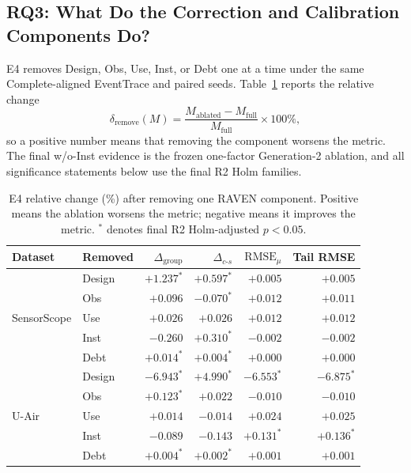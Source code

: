 \documentclass[letterpaper,journal]{IEEEtran}
\begin{document}
\subsection{RQ3: What Do the Correction and Calibration Components Do?}
\label{subsec:eval_rq3}

E4 removes Design, Obs, Use, Inst, or Debt one at a time under the same
Complete-aligned EventTrace and paired seeds.  Table~\ref{tab:e4_ablation}
reports the relative change
\begin{equation}
    \delta_{\mathrm{remove}}(M)
    =
    \frac{M_{\mathrm{ablated}}-M_{\mathrm{full}}}
         {M_{\mathrm{full}}}\times100\%,
    \label{eq:ablation_relative_change}
\end{equation}
so a positive number means that removing the component worsens the metric.
The final w/o-Inst evidence is the frozen one-factor Generation-2 ablation, and
all significance statements below use the final R2 Holm families.

\begin{table}[t]
\centering
\caption{E4 relative change (\%) after removing one RAVEN component.
Positive means the ablation worsens the metric; negative means it improves the
metric.  $^\ast$ denotes final R2 Holm-adjusted $p<0.05$.}
\label{tab:e4_ablation}
\setlength{\tabcolsep}{5pt}
\begin{tabular}{llrrrr}
\hline
Dataset & Removed & $\Delta_{\mathrm{group}}$ &
$\Delta_{c\text{-}s}$ & $\mathrm{RMSE}_{\mu}$ & Tail RMSE\\
\hline
\multirow{5}{*}{SensorScope}
& Design & $+1.237^\ast$ & $+0.597^\ast$ & $+0.005$ & $+0.005$\\
& Obs    & $+0.096$       & $-0.070^\ast$ & $+0.012$ & $+0.011$\\
& Use    & $+0.026$       & $+0.026$       & $+0.012$ & $+0.012$\\
& Inst   & $-0.260$       & $+0.310^\ast$ & $-0.002$ & $-0.002$\\
& Debt   & $+0.014^\ast$ & $+0.004^\ast$ & $+0.000$ & $+0.000$\\
\hline
\multirow{5}{*}{U-Air}
& Design & $-6.943^\ast$ & $+4.990^\ast$ & $-6.553^\ast$ & $-6.875^\ast$\\
& Obs    & $+0.123^\ast$ & $+0.022$       & $-0.010$       & $-0.010$\\
& Use    & $+0.014$       & $-0.014$       & $+0.024$       & $+0.025$\\
& Inst   & $-0.089$       & $-0.143$       & $+0.131^\ast$ & $+0.136^\ast$\\
& Debt   & $+0.004^\ast$ & $+0.002^\ast$ & $+0.001$       & $+0.001$\\
\hline
\end{tabular}
\end{table}
\end{document}
